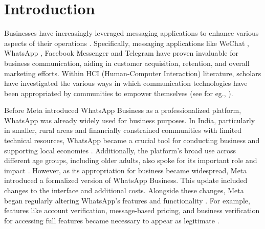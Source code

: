 \section{Introduction}

Businesses have increasingly leveraged messaging applications to enhance various aspects of their operations \cite{anderson2016getting, lo2022mobile, doi:10.1177/20501579241246721}. Specifically, messaging applications like WeChat \cite{yang2016role}, WhatsApp \cite{10.1145/3613905.3651034}, Facebook Messenger and Telegram \cite{LoPresti2021}  have proven invaluable for business communication, aiding in customer acquisition, retention, and overall marketing efforts. Within HCI (Human-Computer Interaction) literature, scholars have investigated the various ways in which communication technologies have been appropriated by communities to empower themselves (see for eg., \cite{10.1145/2660398.2660427, 10.1145/3328020.3353927, 10.1145/3318140, 10.1145/2145204.2145220}). 

Before Meta introduced WhatsApp Business as a professionalized platform, WhatsApp was already widely used for business purposes. In India, particularly in smaller, rural areas \cite{doi:10.1177/20501579241246721} and financially constrained communities \cite{10.1145/3014362.3014367} with limited technical resources, WhatsApp became a crucial tool for conducting business and supporting local economies \cite{modak2017dancing}. Additionally, the platform's broad use across different age groups, including older adults, also spoke for its important role and impact \cite{10.1145/3449212}. However, as its appropriation for business became widespread, Meta introduced a formalized version of WhatsApp Business. This update included changes to the interface and additional costs. Alongside these changes, Meta began regularly altering WhatsApp’s features and functionality \cite{10.1145/3613905.3651034}. For example, features like account verification, message-based pricing, and business verification for accessing full features became necessary to appear as legitimate \cite{meta_verified_business_2024}.




